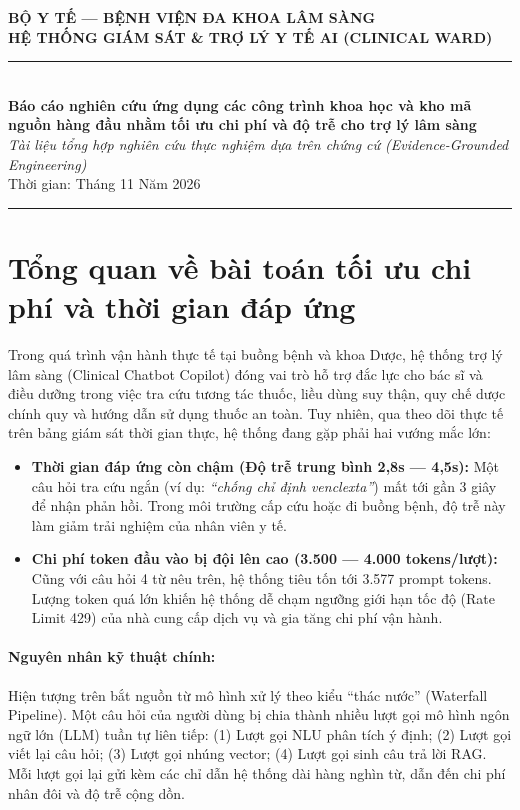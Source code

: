 \documentclass[12pt,a4paper]{article}
\begin{document}
\begin{center}
    {\large \textbf{BỘ Y TẾ --- BỆNH VIỆN ĐA KHOA LÂM SÀNG}}\\[0.3em]
    {\normalsize \textbf{HỆ THỐNG GIÁM SÁT \& TRỢ LÝ Y TẾ AI (CLINICAL WARD)}}\\[0.8em]
    \rule{\textwidth}{1.2pt}\\[0.8em]
    {\Large \textbf{Báo cáo nghiên cứu ứng dụng các công trình khoa học và kho mã nguồn hàng đầu nhằm tối ưu chi phí và độ trễ cho trợ lý lâm sàng}}\\[0.5em]
    {\normalsize \textit{Tài liệu tổng hợp nghiên cứu thực nghiệm dựa trên chứng cứ (Evidence-Grounded Engineering)}}\\[0.3em]
    {\small Thời gian: Tháng 11 Năm 2026}
\end{center}

\vspace{0.5em}
\rule{\textwidth}{0.4pt}

\section{Tổng quan về bài toán tối ưu chi phí và thời gian đáp ứng}

Trong quá trình vận hành thực tế tại buồng bệnh và khoa Dược, hệ thống trợ lý lâm sàng (Clinical Chatbot Copilot) đóng vai trò hỗ trợ đắc lực cho bác sĩ và điều dưỡng trong việc tra cứu tương tác thuốc, liều dùng suy thận, quy chế dược chính quy và hướng dẫn sử dụng thuốc an toàn. Tuy nhiên, qua theo dõi thực tế trên bảng giám sát thời gian thực, hệ thống đang gặp phải hai vướng mắc lớn:

\begin{itemize}[leftmargin=1.5em]
    \item \textbf{Thời gian đáp ứng còn chậm (Độ trễ trung bình 2,8s --- 4,5s):} Một câu hỏi tra cứu ngắn (ví dụ: \textit{``chống chỉ định venclexta''}) mất tới gần 3 giây để nhận phản hồi. Trong môi trường cấp cứu hoặc đi buồng bệnh, độ trễ này làm giảm trải nghiệm của nhân viên y tế.
    \item \textbf{Chi phí token đầu vào bị đội lên cao (3.500 --- 4.000 tokens/lượt):} Cũng với câu hỏi 4 từ nêu trên, hệ thống tiêu tốn tới 3.577 prompt tokens. Lượng token quá lớn khiến hệ thống dễ chạm ngưỡng giới hạn tốc độ (Rate Limit 429) của nhà cung cấp dịch vụ và gia tăng chi phí vận hành.
\end{itemize}

\paragraph{Nguyên nhân kỹ thuật chính:} Hiện tượng trên bắt nguồn từ mô hình xử lý theo kiểu ``thác nước'' (Waterfall Pipeline). Một câu hỏi của người dùng bị chia thành nhiều lượt gọi mô hình ngôn ngữ lớn (LLM) tuần tự liên tiếp: (1) Lượt gọi NLU phân tích ý định; (2) Lượt gọi viết lại câu hỏi; (3) Lượt gọi nhúng vector; (4) Lượt gọi sinh câu trả lời RAG. Mỗi lượt gọi lại gửi kèm các chỉ dẫn hệ thống dài hàng nghìn từ, dẫn đến chi phí nhân đôi và độ trễ cộng dồn.
\end{document}
